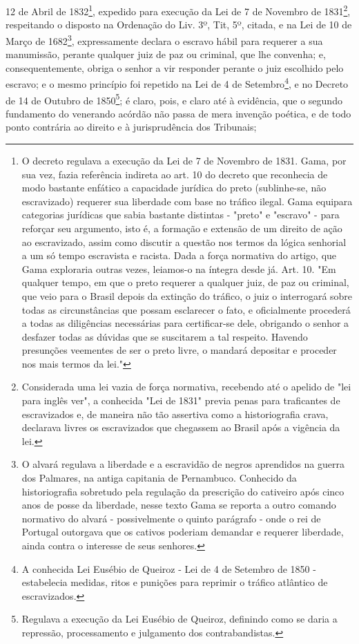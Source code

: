 12 de Abril de 1832\footnote{O decreto regulava a execução da Lei de 7
  de Novembro de 1831. Gama, por sua vez, fazia referência indireta ao
  art. 10 do decreto que reconhecia de modo bastante enfático a
  capacidade jurídica do preto (sublinhe-se, não escravizado) requerer
  sua liberdade com base no tráfico ilegal. Gama equipara categorias
  jurídicas que sabia bastante distintas - "preto" e "escravo" - para
  reforçar seu argumento, isto é, a formação e extensão de um direito de
  ação ao escravizado, assim como discutir a questão nos termos da
  lógica senhorial a um só tempo escravista e racista. Dada a força
  normativa do artigo, que Gama exploraria outras vezes, leiamos-o na
  íntegra desde já. Art. 10. "Em qualquer tempo, em que o preto requerer
  a qualquer juiz, de paz ou criminal, que veio para o Brasil depois da
  extinção do tráfico, o juiz o interrogará sobre todas as
  circunstâncias que possam esclarecer o fato, e oficialmente procederá
  a todas as diligências necessárias para certificar-se dele, obrigando
  o senhor a desfazer todas as dúvidas que se suscitarem a tal respeito.
  Havendo presunções veementes de ser o preto livre, o mandará depositar
  e proceder nos mais termos da lei."}, expedido para execução da Lei de
7 de Novembro de 1831\footnote{Considerada uma lei vazia de força
  normativa, recebendo até o apelido de "lei para inglês ver", a
  conhecida "Lei de 1831" previa penas para traficantes de escravizados
  e, de maneira não tão assertiva como a historiografia crava, declarava
  livres os escravizados que chegassem ao Brasil após a vigência da lei.},
respeitando o disposto na Ordenação do Liv. 3º, Tit, 5º, citada, e na
Lei de 10 de Março de 1682\footnote{O alvará regulava a liberdade e a
  escravidão de negros aprendidos na guerra dos Palmares, na antiga
  capitania de Pernambuco. Conhecido da historiografia sobretudo pela
  regulação da prescrição do cativeiro após cinco anos de posse da
  liberdade, nesse texto Gama se reporta a outro comando normativo do
  alvará - possivelmente o quinto parágrafo - onde o rei de Portugal
  outorgava que os cativos poderiam demandar e requerer liberdade, ainda
  contra o interesse de seus senhores.}, expressamente declara o escravo
hábil para requerer a sua manumissão, perante qualquer juiz de paz ou
criminal, que lhe convenha; e, consequentemente, obriga o senhor a vir
responder perante o juiz escolhido pelo escravo; e o mesmo princípio foi
repetido na Lei de 4 de Setembro\footnote{A conhecida Lei Eusébio de
  Queiroz - Lei de 4 de Setembro de 1850 - estabelecia medidas, ritos e
  punições para reprimir o tráfico atlântico de escravizados.}, e no
Decreto de 14 de Outubro de 1850\footnote{Regulava a execução da Lei
  Eusébio de Queiroz, definindo como se daria a repressão, processamento
  e julgamento dos contrabandistas.}; é claro, pois, e claro até à
evidência, que o segundo fundamento do venerando acórdão não passa de
mera invenção poética, e de todo ponto contrária ao direito e à
jurisprudência dos Tribunais;

